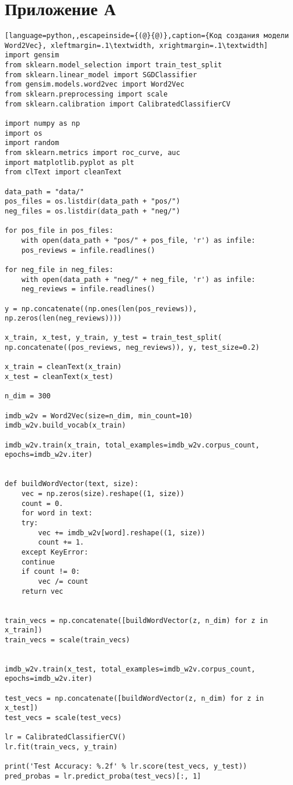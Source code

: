 \chapter{Приложение А}



\begin{lstlisting}[language=python,,escapeinside={(@}{@)},caption={Код создания модели Word2Vec}, xleftmargin=.1\textwidth, xrightmargin=.1\textwidth] 
import gensim
from sklearn.model_selection import train_test_split
from sklearn.linear_model import SGDClassifier
from gensim.models.word2vec import Word2Vec
from sklearn.preprocessing import scale
from sklearn.calibration import CalibratedClassifierCV

import numpy as np
import os
import random
from sklearn.metrics import roc_curve, auc
import matplotlib.pyplot as plt
from clText import cleanText

data_path = "data/"
pos_files = os.listdir(data_path + "pos/")
neg_files = os.listdir(data_path + "neg/")

for pos_file in pos_files:  
	with open(data_path + "pos/" + pos_file, 'r') as infile:
	pos_reviews = infile.readlines()

for neg_file in neg_files:
	with open(data_path + "neg/" + neg_file, 'r') as infile:
	neg_reviews = infile.readlines()

y = np.concatenate((np.ones(len(pos_reviews)), np.zeros(len(neg_reviews))))

x_train, x_test, y_train, y_test = train_test_split(
np.concatenate((pos_reviews, neg_reviews)), y, test_size=0.2)

x_train = cleanText(x_train)
x_test = cleanText(x_test)

n_dim = 300

imdb_w2v = Word2Vec(size=n_dim, min_count=10)
imdb_w2v.build_vocab(x_train)

imdb_w2v.train(x_train, total_examples=imdb_w2v.corpus_count,
epochs=imdb_w2v.iter)


def buildWordVector(text, size):
	vec = np.zeros(size).reshape((1, size))
	count = 0.
	for word in text:
	try:
		vec += imdb_w2v[word].reshape((1, size))
		count += 1.
	except KeyError:
	continue
	if count != 0:
		vec /= count
	return vec


train_vecs = np.concatenate([buildWordVector(z, n_dim) for z in x_train])
train_vecs = scale(train_vecs)


imdb_w2v.train(x_test, total_examples=imdb_w2v.corpus_count,
epochs=imdb_w2v.iter)

test_vecs = np.concatenate([buildWordVector(z, n_dim) for z in x_test])
test_vecs = scale(test_vecs)

lr = CalibratedClassifierCV()
lr.fit(train_vecs, y_train)

print('Test Accuracy: %.2f' % lr.score(test_vecs, y_test))
pred_probas = lr.predict_proba(test_vecs)[:, 1]

\end{lstlisting}